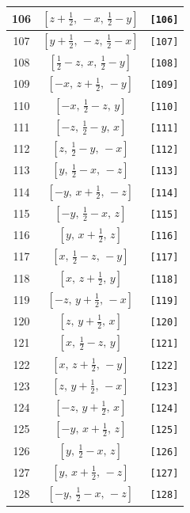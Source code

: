 \documentclass[fleqn,8pt]{jsarticle}
\begin{document}
\begin{longtable}{ccc}
106 & $\left[ z + \frac{1}{2},\, - x,\, \frac{1}{2} - y \right]$ & {\tt [106]} \\ \hline
107 & $\left[ y + \frac{1}{2},\, - z,\, \frac{1}{2} - x \right]$ & {\tt [107]} \\ \hline
108 & $\left[ \frac{1}{2} - z,\, x,\, \frac{1}{2} - y \right]$ & {\tt [108]} \\ \hline
109 & $\left[ - x,\, z + \frac{1}{2},\, - y \right]$ & {\tt [109]} \\ \hline
110 & $\left[ - x,\, \frac{1}{2} - z,\, y \right]$ & {\tt [110]} \\ \hline
111 & $\left[ - z,\, \frac{1}{2} - y,\, x \right]$ & {\tt [111]} \\ \hline
112 & $\left[ z,\, \frac{1}{2} - y,\, - x \right]$ & {\tt [112]} \\ \hline
113 & $\left[ y,\, \frac{1}{2} - x,\, - z \right]$ & {\tt [113]} \\ \hline
114 & $\left[ - y,\, x + \frac{1}{2},\, - z \right]$ & {\tt [114]} \\ \hline
115 & $\left[ - y,\, \frac{1}{2} - x,\, z \right]$ & {\tt [115]} \\ \hline
116 & $\left[ y,\, x + \frac{1}{2},\, z \right]$ & {\tt [116]} \\ \hline
117 & $\left[ x,\, \frac{1}{2} - z,\, - y \right]$ & {\tt [117]} \\ \hline
118 & $\left[ x,\, z + \frac{1}{2},\, y \right]$ & {\tt [118]} \\ \hline
119 & $\left[ - z,\, y + \frac{1}{2},\, - x \right]$ & {\tt [119]} \\ \hline
120 & $\left[ z,\, y + \frac{1}{2},\, x \right]$ & {\tt [120]} \\ \hline
121 & $\left[ x,\, \frac{1}{2} - z,\, y \right]$ & {\tt [121]} \\ \hline
122 & $\left[ x,\, z + \frac{1}{2},\, - y \right]$ & {\tt [122]} \\ \hline
123 & $\left[ z,\, y + \frac{1}{2},\, - x \right]$ & {\tt [123]} \\ \hline
124 & $\left[ - z,\, y + \frac{1}{2},\, x \right]$ & {\tt [124]} \\ \hline
125 & $\left[ - y,\, x + \frac{1}{2},\, z \right]$ & {\tt [125]} \\ \hline
126 & $\left[ y,\, \frac{1}{2} - x,\, z \right]$ & {\tt [126]} \\ \hline
127 & $\left[ y,\, x + \frac{1}{2},\, - z \right]$ & {\tt [127]} \\ \hline
128 & $\left[ - y,\, \frac{1}{2} - x,\, - z \right]$ & {\tt [128]} \\ \hline

\end{longtable}
\end{document}
